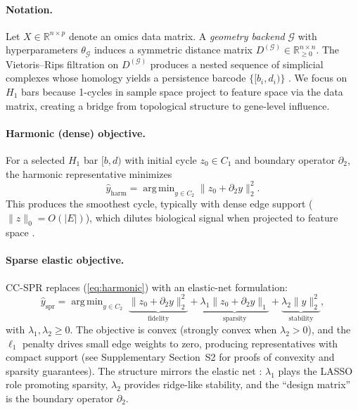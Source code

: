 \documentclass[12pt]{article}
\DeclareMathOperator*{\argmin}{arg\,min}
\begin{document}
\paragraph{Notation.}
Let $X \in \mathbb{R}^{n \times p}$ denote an omics data matrix.
A \emph{geometry backend} $\mathcal{G}$ with hyperparameters $\theta_{\mathcal{G}}$ induces a symmetric distance matrix $D^{(\mathcal{G})} \in \mathbb{R}_{\ge 0}^{n \times n}$.
The Vietoris--Rips filtration on $D^{(\mathcal{G})}$ produces a nested sequence of simplicial complexes whose homology yields a persistence barcode $\{[b_i, d_i)\}$ \citep{zomorodian2005, edelsbrunner2010}.
We focus on $H_1$ bars because 1-cycles in sample space project to feature space via the data matrix, creating a bridge from topological structure to gene-level influence.

\paragraph{Harmonic (dense) objective.}
For a selected $H_1$ bar $[b, d)$ with initial cycle $z_0 \in C_1$ and boundary operator $\partial_2$, the harmonic representative minimizes
\begin{equation}\label{eq:harmonic}
\hat{y}_{\mathrm{harm}} = \argmin_{y \in C_2} \| z_0 + \partial_2 y \|_2^2.
\end{equation}
This produces the smoothest cycle, typically with dense edge support ($\|z\|_0 = O(|E|)$), which dilutes biological signal when projected to feature space \citep{harmonicPH, friedman1998}.

\paragraph{Sparse elastic objective.}
CC-SPR replaces (\ref{eq:harmonic}) with an elastic-net formulation:
\begin{equation}\label{eq:ccspr}
\hat{y}_{\mathrm{spr}} = \argmin_{y \in C_2} \;\underbrace{\| z_0 + \partial_2 y \|_2^2}_{\text{fidelity}} + \underbrace{\lambda_1 \| z_0 + \partial_2 y \|_1}_{\text{sparsity}} + \underbrace{\lambda_2 \| y \|_2^2}_{\text{stability}},
\end{equation}
with $\lambda_1, \lambda_2 \ge 0$.
The objective is convex (strongly convex when $\lambda_2 > 0$), and the $\ell_1$ penalty drives small edge weights to zero, producing representatives with compact support (see Supplementary Section~S2 for proofs of convexity and sparsity guarantees).
The structure mirrors the elastic net \citep{zou2005elasticnet}: $\lambda_1$ plays the LASSO role promoting sparsity, $\lambda_2$ provides ridge-like stability, and the ``design matrix'' is the boundary operator $\partial_2$.
\end{document}

